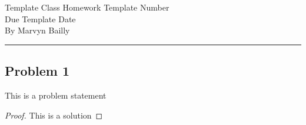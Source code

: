\documentclass[12pt]{report}
\begin{document}
\large
\begin{center}
Template Class Homework Template Number \\
Due Template Date \\
By Marvyn Bailly \\
\end{center}
\normalsize
\hrule




\begin{problem}%
\subsection*{Problem 1}

This is a problem statement

\begin{proof}

This is a solution

\end{proof}
\end{problem}




\end{document}
